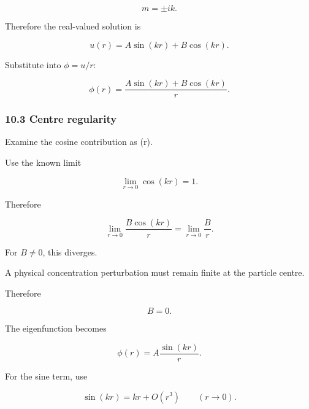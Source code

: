 \documentclass[11pt,a4paper]{article}
\begin{document}
\begin{equation}
m=\pm ik.
\tag{TRISO-ANA-268}
\label{eq:triso-ana-268}
\end{equation}

Therefore the real-valued solution is

\begin{equation}
\boxed{
u(r)=A\sin(kr)+B\cos(kr).
}
\tag{TRISO-ANA-269}
\label{eq:triso-ana-269}
\end{equation}

Substitute into $\phi=u/r$:

\begin{equation}
\phi(r)
=
\frac{A\sin(kr)+B\cos(kr)}{r}.
\tag{TRISO-ANA-270}
\label{eq:triso-ana-270}
\end{equation}

\subsubsection*{10.3 Centre regularity}

Examine the cosine contribution as (r).

Use the known limit

\begin{equation}
\lim_{r\to0}\cos(kr)=1.
\tag{TRISO-ANA-271}
\label{eq:triso-ana-271}
\end{equation}

Therefore

\begin{equation}
\lim_{r\to0}\frac{B\cos(kr)}{r}
=
\lim_{r\to0}\frac{B}{r}.
\tag{TRISO-ANA-272}
\label{eq:triso-ana-272}
\end{equation}

For $B\ne0$, this diverges.

A physical concentration perturbation must remain finite at the particle centre.

Therefore

\begin{equation}
B=0.
\tag{TRISO-ANA-273}
\label{eq:triso-ana-273}
\end{equation}

The eigenfunction becomes

\begin{equation}
\phi(r)=A\frac{\sin(kr)}{r}.
\tag{TRISO-ANA-274}
\label{eq:triso-ana-274}
\end{equation}

For the sine term, use

\begin{equation}
\sin(kr)=kr+O(r^3)
\qquad
(r\to0).
\tag{TRISO-ANA-275}
\label{eq:triso-ana-275}
\end{equation}
\end{document}
